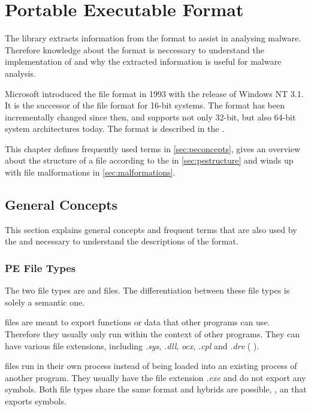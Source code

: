 \chapter{Portable Executable Format} \label{chap:peformat}

The library \portex{} extracts information from the \PE{} format to assist in analysing malware. Therefore knowledge about the \PE{} format is neccessary to understand the implementation of \portex{} and why the extracted information is useful for malware analysis. 

Microsoft introduced the \PE{} file format in 1993 with the release of Windows NT 3.1. It is the successor of the \NZ{} file format for 16-bit systems. The \PE{} format has been incrementally changed since then, and supports not only 32-bit, but also 64-bit system architectures today. The \PE{} format is described in the \PECOFF{} \cite{pespec}. 

This chapter defines frequently used terms in \autoref{sec:peconcepts}, gives an overview about the structure of a \PE{} file according to the \PECOFF{} in \autoref{sec:pestructure} and winds up with \PE{} file malformations in \autoref{sec:malformations}.

\section{General Concepts}\label{sec:peconcepts}

This section explains general concepts and frequent terms that are also used by the \PECOFF{} and necessary to understand the descriptions of the \PE{} format.

\subsection*{PE File Types}

The two \PE{} file types are \DLL{} and \EXE{} files. The differentiation between these file types is solely a semantic one. 

\DLL{} files are meant to export functions or data that other programs can use. Therefore they usually only run within the context of other programs. They can have various file extensions, including \emph{.sys}, \emph{.dll}, \emph{ocx}, \emph{.cpl} and \emph{.drv} (\cf{} \cite{micrdll}). 

\EXE{} files run in their own process instead of being loaded into an existing process of another program. They usually have the file extension \emph{.exe} and do not export any symbols. Both file types share the same format and hybrids are possible, \eg{}, an \EXE{} that exports symbols.

